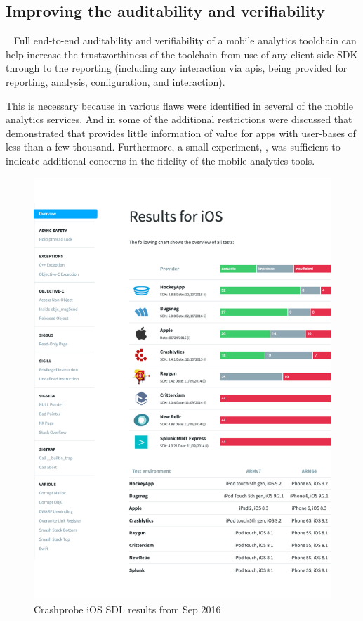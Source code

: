 \subsection{Improving the auditability and verifiability}~\label{tata-improving-auditability-and-verifiability}
Full end-to-end auditability and verifiability of a mobile analytics toolchain can help increase the trustworthiness of the toolchain from use of any client-side SDK through to the reporting (including any interaction via \Glspl{api}, being provided for reporting, analysis, configuration, and interaction).

This is necessary because in  various flaws were identified in several of the mobile analytics services. And in  some of the additional restrictions were discussed that demonstrated that  provides little information of value for apps with user-bases of less than a few thousand. Furthermore, a small experiment, , was sufficient to indicate additional concerns in the fidelity of the mobile analytics tools.

\begin{figure}
    \centering
    \includegraphics[width=\linewidth]{images/crashprobe.com/CrashProbe-Results-for-iOS-2016-09-06.pdf}
    \caption{Crashprobe iOS SDL results from  Sep 2016}
    \label{fig:crashprobe-ios-results}
\end{figure}


